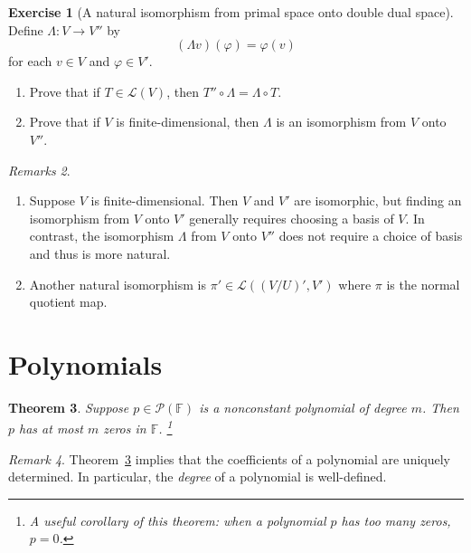 \documentclass[nofonts,colorlinks]{tufte-handout}
\theoremstyle{plain} %
\newtheorem{thm}{Theorem}
\theoremstyle{definition}
\newtheorem{exer}[thm]{Exercise}
\theoremstyle{remark}
\newtheorem{rmk}[thm]{Remark}
\newtheorem{rmks}[thm]{Remarks}
\newcommand{\bra}[1]{\mathopen{}\left(#1\right)}
\renewcommand{\phi}{\varphi}
\newcommand{\F}{\mathbb{F}}
\renewcommand{\L}{\mathcal{L}}
\renewcommand{\P}{\mathcal{P}}
\begin{document}
\begin{exer}[A natural isomorphism from primal space onto double dual space]
	Define $\Lambda:V\to V''$ by
	\[(\Lambda v)(\phi)=\phi(v)\]
	for each $v\in V$ and $\phi\in V'$.
	\begin{enumerate}
		\item Prove that if $T\in\L(V)$, then $T''\circ\Lambda=\Lambda\circ T$.
		\item Prove that if $V$ is finite-dimensional, then $\Lambda$ is an isomorphism from $V$ onto $V''$.
	\end{enumerate}
\end{exer}

\begin{rmks}
	\begin{enumerate}
		\item Suppose $V$ is finite-dimensional. Then $V$ and $V'$ are isomorphic, but finding an isomorphism from $V$ onto $V'$ generally requires choosing a basis of $V$. In contrast, the isomorphism $\Lambda$ from $V$ onto $V''$ does not require a choice of basis and thus is more natural.
		\item Another natural isomorphism is $\pi'\in\L\bra{(V/U)',V'}$ where $\pi$ is the normal quotient map.
	\end{enumerate}
\end{rmks}


\section{Polynomials}

\begin{thm}\label{thm: limited number of zeros of polynomials}
	Suppose $p\in\P(\F)$ is a nonconstant polynomial of degree $m$. Then $p$ has at most $m$ zeros in $\F$.%
	\footnote{A useful corollary of this theorem: when a polynomial $p$ has too many zeros, $p=0$.}
\end{thm}

\begin{rmk}
	Theorem~\ref{thm: limited number of zeros of polynomials} implies that the coefficients of a polynomial are uniquely determined. In particular, the \emph{degree} of a polynomial is well-defined.
\end{rmk}
\end{document}
